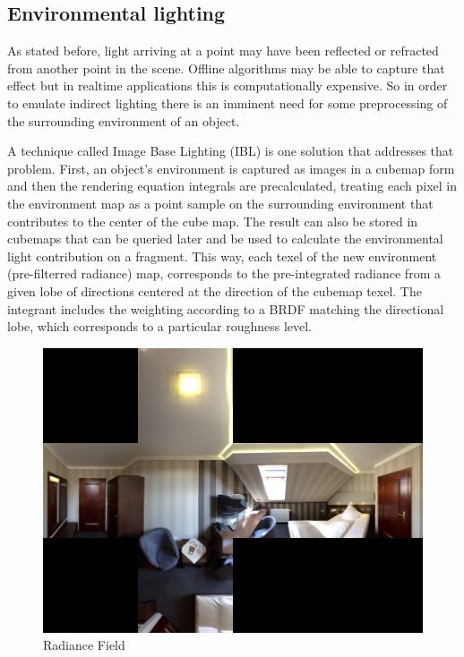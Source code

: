 \subsection{Environmental lighting}
As stated before, light arriving at a point may have been reflected or refracted from another point in the scene.
Offline algorithms may be able to capture that effect but in realtime applications this is computationally expensive.
So in order to emulate indirect lighting there is an imminent need for some preprocessing of the surrounding
environment of an object.

A technique called Image Base Lighting (IBL) is one solution that addresses that problem. First, an object's environment is
captured as images in a cubemap form and then the rendering equation integrals are precalculated, treating each pixel in the
environment map as a point sample on the surrounding environment that contributes to the center of the cube map. The result
can also be stored in cubemaps that can be queried later and be used to calculate the environmental light contribution on a
fragment. This way, each texel of the new environment (pre-filterred radiance) map, corresponds to the pre-integrated radiance
from a given lobe of directions centered at the direction of the cubemap texel. The integrant includes the weighting according
to a BRDF matching the directional lobe, which corresponds to a particular roughness level.

\begin{figure}[h]
    \centering
    \includegraphics[scale=0.18,clip=true]{./image/envl_ref.png}
    \caption{Radiance Field}
\label{fig:envlref}
\end{figure}

